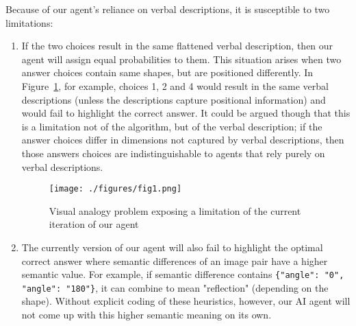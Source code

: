 \documentclass[10pt,letterpaper]{article}
\begin{document}
Because of our agent's reliance on verbal descriptions, it is susceptible to two limitations:

\begin{enumerate}
\item If the two choices result in the same flattened verbal description, then our agent will assign equal probabilities to them. This situation arises when two answer choices contain same shapes, but are positioned differently. In Figure~\ref{fig1}, for example, choices 1, 2 and 4 would result in the same verbal descriptions (unless the descriptions capture positional information) and would fail to highlight the correct answer. It could be argued though that this is a limitation not of the algorithm, but of the verbal description; if the answer choices differ in dimensions not captured by verbal descriptions, then those answers choices are indistinguishable to agents that rely purely on verbal descriptions.

\begin{figure}
\centering
\texttt{[image: ./figures/fig1.png]}
\caption{Visual analogy problem exposing a limitation of the current iteration of our agent\label{fig1}}
\end{figure}

\item The currently version of our agent will also fail to highlight the optimal correct answer where semantic differences of an image pair have a higher semantic value. For example, if semantic difference contains {\small \tt\{"angle": "0", "angle": "180"\}}, it can combine to mean "reflection" (depending on the shape). Without explicit coding of these heuristics, however, our AI agent will not come up with this higher semantic meaning on its own.
\end{enumerate}
\end{document}

